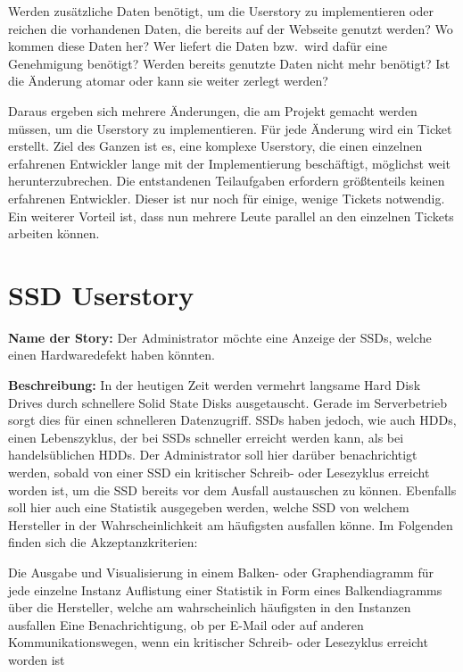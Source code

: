 \begin{outline}
  \1 Werden zusätzliche Daten benötigt, um die Userstory zu implementieren oder
  reichen die vorhandenen Daten, die bereits auf der Webseite genutzt werden?
  \1 Wo kommen diese Daten her?
  \1 Wer liefert die Daten bzw.\ wird dafür eine Genehmigung benötigt?
  \1 Werden bereits genutzte Daten nicht mehr benötigt?
  \1 Ist die Änderung atomar oder kann sie weiter zerlegt werden?
\end{outline}

Daraus ergeben sich mehrere Änderungen, die am Projekt gemacht werden müssen,
um die Userstory zu implementieren. Für jede Änderung wird ein Ticket erstellt.
Ziel des Ganzen ist es, eine komplexe Userstory, die einen einzelnen erfahrenen
Entwickler lange mit der Implementierung beschäftigt, möglichst weit
herunterzubrechen. Die entstandenen Teilaufgaben erfordern größtenteils keinen
erfahrenen Entwickler. Dieser ist nur noch für einige, wenige Tickets
notwendig.  Ein weiterer Vorteil ist, dass nun mehrere Leute parallel an den
einzelnen Tickets arbeiten können.
\tm%

\section{SSD Userstory}
\textbf{Name der Story:} Der Administrator möchte eine Anzeige der SSDs, welche
einen Hardwaredefekt haben könnten.

\textbf{Beschreibung:} In der heutigen Zeit werden vermehrt langsame
Hard Disk Drives durch schnellere Solid State Disks ausgetauscht. Gerade im
Serverbetrieb sorgt dies für einen schnelleren Datenzugriff. SSDs haben
jedoch, wie auch HDDs, einen Lebenszyklus, der bei SSDs schneller erreicht
werden kann, als bei handelsüblichen HDDs. Der Administrator soll hier darüber
benachrichtigt werden, sobald von einer SSD ein kritischer Schreib- oder
Lesezyklus erreicht worden ist, um die SSD bereits vor dem Ausfall austauschen
zu können. Ebenfalls soll hier auch eine Statistik ausgegeben werden, welche
SSD von welchem Hersteller in der Wahrscheinlichkeit am häufigsten ausfallen
könne. Im Folgenden finden sich die Akzeptanzkriterien:

\begin{outline}
  \1 Die Ausgabe und Visualisierung in einem Balken- oder Graphendiagramm
  für jede einzelne Instanz
  \1 Auflistung einer Statistik in Form eines Balkendiagramms über die
  Hersteller, welche am wahrscheinlich häufigsten in den Instanzen ausfallen
  \1 Eine Benachrichtigung, ob per E-Mail oder auf anderen Kommunikationswegen,
  wenn ein kritischer Schreib- oder Lesezyklus erreicht worden ist
\end{outline}

